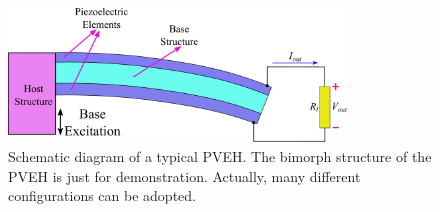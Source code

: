\documentclass{svjour3}                     %
\begin{document}
\begin{figure}[!htbp]
    \centering
    \includegraphics[width=0.8\textwidth]{./img_eig_asy/fig_pveh}
    \caption{Schematic diagram of a typical PVEH. The bimorph structure of the PVEH is just for demonstration. Actually, many different configurations can be adopted. }
    \label{fig:fig_pveh}
\end{figure}
\end{document}
